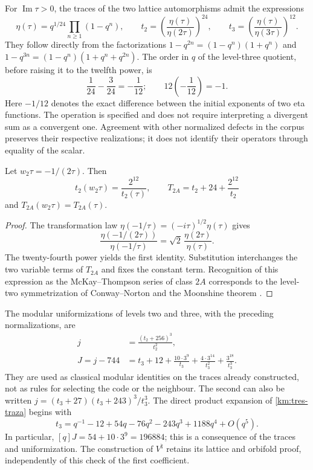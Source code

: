 For \(\operatorname{Im}\tau>0\), the traces of the two lattice
automorphisms admit the expressions
\begin{equation}
 \eta(\tau)=q^{1/24}\prod_{n\ge1}(1-q^n),\qquad
 t_2=\left(\frac{\eta(\tau)}{\eta(2\tau)}\right)^{24},\qquad
 t_3=\left(\frac{\eta(\tau)}{\eta(3\tau)}\right)^{12}.
 \label{km:eta-trazas}
\end{equation}
They follow directly from the factorizations
\(1-q^{2n}=(1-q^n)(1+q^n)\) and
\(1-q^{3n}=(1-q^n)(1+q^n+q^{2n})\). The order in \(q\) of the
level-three quotient, before raising it to the twelfth power, is
\[
 \frac1{24}-\frac3{24}=-\frac1{12};
 \qquad 12\left(-\frac1{12}\right)=-1.
\]
Here \(-1/12\) denotes the exact difference between the initial
exponents of two eta functions. The operation is specified and
does not require interpreting a divergent sum as a convergent one.
Agreement with other normalized defects in the corpus preserves
their respective realizations; it does not identify their operators
through equality of the scalar.

\begin{proposition}
\label{km:fricke-prop}
Let \(w_2\tau=-1/(2\tau)\). Then
\begin{equation}
 t_2(w_2\tau)=\frac{2^{12}}{t_2(\tau)},\qquad
 T_{2A}=t_2+24+\frac{2^{12}}{t_2}
 \label{km:fricke-t2}
\end{equation}
and \(T_{2A}(w_2\tau)=T_{2A}(\tau)\).
\end{proposition}
\begin{proof}
The transformation law
\(\eta(-1/\tau)=(-i\tau)^{1/2}\eta(\tau)\) gives
\[
 \frac{\eta(-1/(2\tau))}{\eta(-1/\tau)}
 =\sqrt2\,\frac{\eta(2\tau)}{\eta(\tau)}.
\]
The twenty-fourth power yields the first identity. Substitution
interchanges the two variable terms of \(T_{2A}\) and fixes
the constant term. Recognition of this expression as the
McKay--Thompson series of class \(2A\) corresponds to the
level-two symmetrization of Conway--Norton
\cite[\S\S4 and 6, Table~3]{kmconwaynorton1979} and the
Moonshine theorem \cite{borcherds}.
\end{proof}

The modular uniformizations of levels two and three, with the
preceding normalizations, are
\begin{align}
 j&=\frac{(t_2+256)^3}{t_2^2},
 \label{km:j-nivel2}\\
 J=j-744
 &=t_3+12+\frac{10\cdot3^9}{t_3}
       +\frac{4\cdot3^{14}}{t_3^2}
       +\frac{3^{18}}{t_3^3}.
 \label{km:j-nivel3}
\end{align}
They are used as classical modular identities on the traces already
constructed, not as rules for selecting the code or the neighbour.
The second can also be written
\(j=(t_3+27)(t_3+243)^3/t_3^3\).
The direct product expansion of \eqref{km:tres-traza} begins with
\[
 t_3=q^{-1}-12+54q-76q^2-243q^3+1188q^4+O(q^5).
\]
In particular, \([q]J=54+10\cdot3^9=196884\); this is a
consequence of the traces and uniformization. The construction of
\(V^\natural\) retains its lattice and orbifold proof,
independently of this check of the first coefficient.

